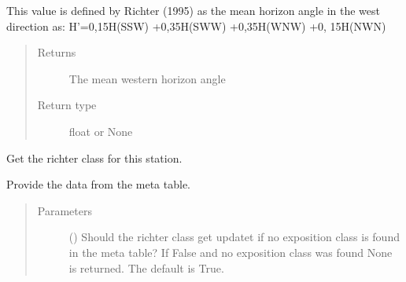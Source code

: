 \documentclass[letterpaper,10pt,english]{sphinxmanual}
\begin{document}
\begin{fulllineitems}
\begin{fulllineitems}
\sphinxAtStartPar
This value is defined by Richter (1995) as the mean horizon angle in the west direction as:
H’=0,15H(S\sphinxhyphen{}SW) +0,35H(SW\sphinxhyphen{}W) +0,35H(W\sphinxhyphen{}NW) +0, 15H(NW\sphinxhyphen{}N)
\begin{quote}\begin{description}
\item[{Returns}] \leavevmode
\sphinxAtStartPar
The mean western horizon angle

\item[{Return type}] \leavevmode
\sphinxAtStartPar
float or None

\end{description}\end{quote}

\end{fulllineitems}


\begin{fulllineitems}
\label{\detokenize{weatherDB:weatherDB.station.PrecipitationStation.get_qn}}
\end{fulllineitems}


\begin{fulllineitems}
\label{\detokenize{weatherDB:weatherDB.station.PrecipitationStation.get_richter_class}}
\sphinxAtStartPar
Get the richter class for this station.

\sphinxAtStartPar
Provide the data from the meta table.
\begin{quote}\begin{description}
\item[{Parameters}] \leavevmode
\sphinxAtStartPar
{} (\sphinxstyleliteralemphasis{\sphinxupquote{, }}) \textendash{} Should the richter class get updatet if no exposition class is found in the meta table?
If False and no exposition class was found None is returned.
The default is True.


\end{description}
\end{quote}
\end{fulllineitems}
\end{fulllineitems}
\end{document}
